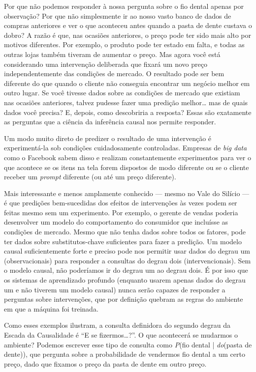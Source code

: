 \documentclass[11pt,a5paper,twoside]{book}
\begin{document}
Por que não podemos responder à nossa pergunta sobre o fio dental apenas por observação? Por que não simplesmente ir ao nosso vasto banco de dados de compras anteriores e ver o que aconteceu antes quando a pasta de dente custava o dobro? A razão é que, nas ocasiões anteriores, o preço pode ter sido mais alto por motivos diferentes. Por exemplo, o produto pode ter estado em falta, e todas as outras lojas também tiveram de aumentar o preço. Mas agora você está considerando uma intervenção deliberada que fixará um novo preço independentemente das condições de mercado. O resultado pode ser bem diferente do que quando o cliente não conseguia encontrar um negócio melhor em outro lugar. Se você tivesse dados sobre as condições de mercado que existiam nas ocasiões anteriores, talvez pudesse fazer uma predição melhor… mas de quais dados você precisa? E, depois, como descobriria a resposta? Essas são exatamente as perguntas que a ciência da inferência causal nos permite responder.

Um modo muito direto de predizer o resultado de uma intervenção é experimentá-la sob condições cuidadosamente controladas. Empresas de \textit{big data} como o Facebook sabem disso e realizam constantemente experimentos para ver o que acontece se os itens na tela forem dispostos de modo diferente ou se o cliente receber um \textit{prompt} diferente (ou até um preço diferente).

Mais interessante e menos amplamente conhecido — mesmo no Vale do Silício — é que predições bem-sucedidas dos efeitos de intervenções às vezes podem ser feitas mesmo sem um experimento. Por exemplo, o gerente de vendas poderia desenvolver um modelo do comportamento do consumidor que incluísse as condições de mercado. Mesmo que não tenha dados sobre todos os fatores, pode ter dados sobre substitutos-chave suficientes para fazer a predição. Um modelo causal suficientemente forte e preciso pode nos permitir usar dados do degrau um (observacionais) para responder a consultas do degrau dois (intervencionais). Sem o modelo causal, não poderíamos ir do degrau um ao degrau dois. É por isso que os sistemas de aprendizado profundo (enquanto usarem apenas dados do degrau um e não tiverem um modelo causal) nunca serão capazes de responder a perguntas sobre intervenções, que por definição quebram as regras do ambiente em que a máquina foi treinada.

Como esses exemplos ilustram, a consulta definidora do segundo degrau da Escada da Causalidade é “E se fizermos…?”. O que acontecerá se mudarmos o ambiente? Podemos escrever esse tipo de consulta como \textit{P}(fio dental | \textit{do}(pasta de dente)), que pergunta sobre a probabilidade de vendermos fio dental a um certo preço, dado que fixamos o preço da pasta de dente em outro preço.
\end{document}
